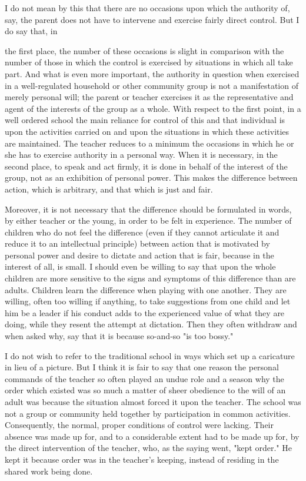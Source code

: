 I do not mean by this that there are no occasions upon which the authority of, say, the 
parent does not have to intervene and exercise fairly direct control. But I do say that, in 



the first place, the number of these occasions is slight in comparison with the number of 
those in which the control is exercised by situations in which all take part. And what is 
even more important, the authority in question when exercised in a well-regulated 
household or other community group is not a manifestation of merely personal will; the 
parent or teacher exercises it as the representative and agent of the interests of the group 
as a whole. With respect to the first point, in a well ordered school the main reliance for 
control of this and that individual is upon the activities carried on and upon the situations 
in which these activities are maintained. The teacher reduces to a minimum the occasions 
in which he or she has to exercise authority in a personal way. When it is necessary, in 
the second place, to speak and act firmly, it is done in behalf of the interest of the group, 
not as an exhibition of personal power. This makes the difference between action, which 
is arbitrary, and that which is just and fair. 

Moreover, it is not necessary that the difference should be formulated in words, by 
either teacher or the young, in order to be felt in experience. The number of children who 
do not feel the difference (even if they cannot articulate it and reduce it to an intellectual 
principle) between action that is motivated by personal power and desire to dictate and 
action that is fair, because in the interest of all, is small. I should even be willing to say 
that upon the whole children are more sensitive to the signs and symptoms of this 
difference than are adults. Children learn the difference when playing with one another. 
They are willing, often too willing if anything, to take suggestions from one child and let 
him be a leader if his conduct adds to the experienced value of what they are doing, while 
they resent the attempt at dictation. Then they often withdraw and when asked why, say 
that it is because so-and-so "is too bossy." 

I do not wish to refer to the traditional school in ways which set up a caricature in lieu 
of a picture. But I think it is fair to say that one reason the personal commands of the 
teacher so often played an undue role and a season why the order which existed was so 
much a matter of sheer obedience to the will of an adult was because the situation almost 
forced it upon the teacher. The school was not a group or community held together by 
participation in common activities. Consequently, the normal, proper conditions of 
control were lacking. Their absence was made up for, and to a considerable extent had to 
be made up for, by the direct intervention of the teacher, who, as the saying went, "kept 
order." He kept it because order was in the teacher's keeping, instead of residing in the 
shared work being done. 

